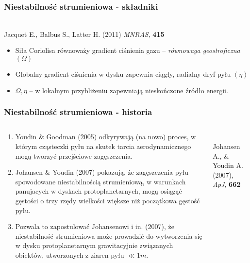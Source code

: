 \documentclass{beamer}
\begin{document}
\begin{frame}
   \frametitle{Niestabilność strumieniowa - składniki}
   \begin{center}
      \\
      {\scriptsize Jacquet E., Balbus S., Latter H. (2011) \emph{MNRAS}, \bf{415}}
   \end{center}
   \begin{itemize}
      \item Siła Coriolisa równoważy gradient ciśnienia gazu -- \emph{równowaga geostroficzna} $(\Omega)$
      \item Globalny gradient ciśnienia w dysku zapewnia ciągły, radialny dryf pyłu $(\eta)$
      \item $\Omega, \eta$ -- \alert{w lokalnym przybliżeniu zapewniają nieskończone źródło energii.}
   \end{itemize}
\end{frame}

\begin{frame}
\frametitle{Niestabilność strumieniowa - historia}
\begin{columns}
   \begin{column}{0.5\textwidth}
      {\scriptsize
      \begin{enumerate}
         \item Youdin \& Goodman (2005) odkyrywają (na nowo) proces, w którym cząsteczki pyłu na skutek tarcia aerodynamicznego
	 	mogą tworzyć przejściowe zagęszczenia.
         \item Johansen \& Youdin (2007) pokazują, że zagęszczenia pyłu spowodowane niestabilnością strumieniową, w warunkach panujacych
	       w dyskach protoplanetarnych, mogą osiągąć gęstości o trzy rzędy wielkości większe niż początkowa gęstość pyłu.
	 \item Pozwala to zapostulować Johansenowi i in. (2007), że niestabilność strumieniowa może prowadzić do wytworzenia się w dysku
	       protoplanetarnym grawitacyjnie związanych obiektów, utworzonych z ziaren pyłu $\ll1m$.
      \end{enumerate}
      }
   \end{column}
   \begin{column}{0.5\textwidth}
      \begin{center}
         \\
         {\scriptsize Johansen A., \& Youdin A. (2007), \emph{ApJ}, \bf{662}}
      \end{center}
   \end{column}
\end{columns}
\end{frame}
\end{document}
